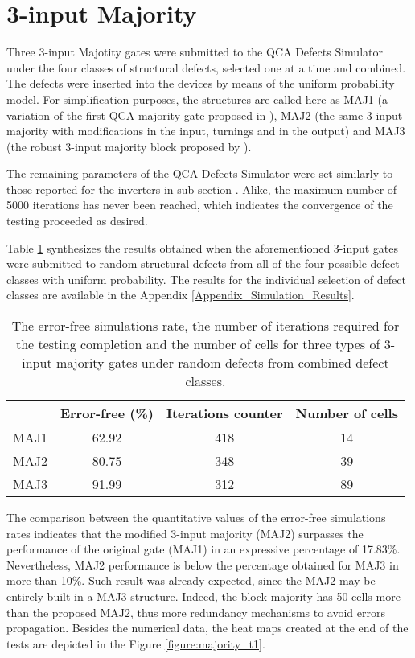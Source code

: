 \section{3-input Majority}
\label{section:Majority}

Three 3-input Majotity gates were submitted to the QCA Defects Simulator under the four classes of structural defects, selected one at a time and combined. The defects were inserted into the devices by means of the uniform probability model. 
For simplification purposes, the structures are called here as MAJ1 (a variation of the first QCA majority gate proposed in \cite{tougaw94}), MAJ2 (the same  3-input majority with modifications in the input, turnings and in the output) and MAJ3 (the robust 3-input majority block proposed by ).

The remaining parameters of the QCA Defects Simulator were set similarly to those reported for the inverters in sub section \label{section:Inverter}. Alike, the maximum number of 5000 iterations has never been reached, which indicates the convergence of the testing proceeded as desired.

Table \ref{table:majority} synthesizes the results obtained when the aforementioned 3-input gates were submitted to random structural defects from all of the four possible defect classes with uniform probability. The results for the individual selection of defect classes are available in the Appendix \ref{Appendix_Simulation_Results}. 

\begin{table}[h]
\centering
\caption{The error-free simulations rate, the number of iterations required for the testing completion and the number of cells for three types of 3-input majority gates under random defects from combined defect classes.}
\label{table:majority}
\begin{tabular}{|c|c|c|c|}
\hline
 & Error-free (\%) & Iterations counter & Number of cells \\
\hline
 MAJ1 & 62.92 & 418 & 14 \\
\hline
 MAJ2 & 80.75 & 348 & 39 \\
\hline
 MAJ3 & 91.99 & 312 & 89 \\
\hline
\end{tabular}
\end{table}

The comparison between the quantitative values of the error-free simulations rates indicates that the modified 3-input majority (MAJ2) surpasses the performance of the original gate (MAJ1) in an expressive percentage of 17.83\%. Nevertheless, MAJ2 performance is below the percentage obtained for MAJ3 in more than 10\%. Such result was already expected, since the MAJ2 may be entirely built-in a MAJ3 structure. Indeed, the  block majority has 50 cells more than the proposed MAJ2, thus more redundancy mechanisms to avoid errors propagation. Besides the numerical data, the heat maps created at the end of the tests are depicted in the Figure \ref{figure:majority_t1}.


